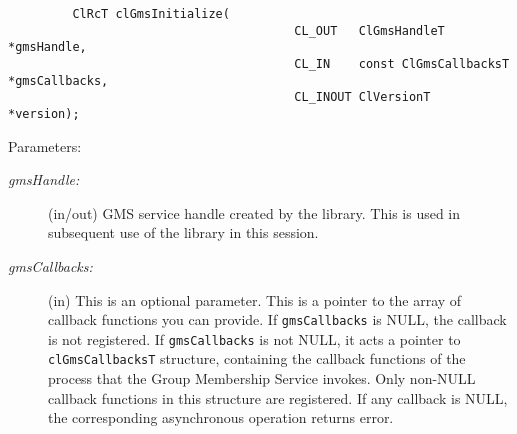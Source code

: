 \begin{flushleft}
\begin{Desc}
\footnotesize\begin{verbatim}         ClRcT clGmsInitialize(
                                		CL_OUT   ClGmsHandleT          *gmsHandle,
                                		CL_IN    const ClGmsCallbacksT *gmsCallbacks,
                                		CL_INOUT ClVersionT            *version);
\end{verbatim}
\normalsize
\end{Desc}
\begin{Desc}
\item[Parameters:]
\begin{description}
\item[{\em gms\-Handle:}](in/out) GMS service handle created by the library. This is used in subsequent use of the library in this session.
\item[{\em gms\-Callbacks:}](in) This is an optional parameter. This is a pointer to the array of callback functions you can provide.
If {\tt{gms\-Callbacks}} is NULL, the callback is not registered.
If {\tt{gms\-Callbacks}} is not NULL, it acts a pointer to
{\tt{cl\-Gms\-Callbacks\-T}} structure, containing the callback functions
of the process that the Group Membership Service invokes. Only
non-NULL callback functions in this structure are registered. If any
callback is NULL, the corresponding asynchronous operation returns
error.


\end{description}
\end{Desc}
\end{flushleft}
